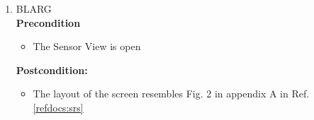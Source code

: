 \documentclass[a4paper]{article}
\newlength{\testlabellength}
\newenvironment{testlist}{\begin{enumerate}[label=\bfseries Instruction \thesubsection.\arabic* , labelindent=0pt, labelwidth=\testlabellength , leftmargin=2cm]}{\end{enumerate}}
\newenvironment{precondition}{
{\color{white}BLARG}\\ 
\textbf{Precondition}
\begin{itemize}[labelindent=0cm, labelwidth=2cm , leftmargin=1cm]
}
{\end{itemize}}
\newenvironment{instruction}{
\textbf{Instructions:}
\begin{enumerate}[label=\bfseries  \arabic*., labelindent=0cm, labelwidth=2cm , leftmargin=1cm]
}
{\end{enumerate}}
\newenvironment{postcondition}{
\textbf{Postcondition:}
\begin{itemize}[labelindent=0cm, labelwidth=2cm , leftmargin=1cm]
}
{\end{itemize}}
\begin{document}
\begin{appendices}
\begin{testlist}
%


	\item
		\begin{precondition}
			\item The Sensor View is open
		\end{precondition}
		\begin{postcondition}
			\item The layout of the screen resembles Fig. 2 in appendix A in Ref. \ref{refdocs:srs}
		\end{postcondition}
\end{testlist}


\end{appendices}
\end{document}
